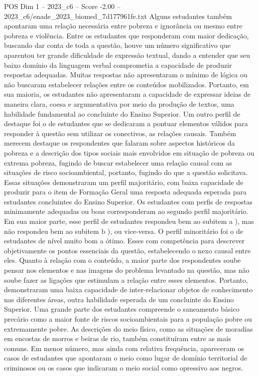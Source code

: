 \begin{textsample}{POS Dim 1 – 2023\_c6 – Score -2.00 – 2023\_c6/enade\_2023\_biomed\_7d177961fe.txt}
Alguns estudantes também apontaram uma relação necessária entre pobreza e ignorância ou mesmo entre pobreza e violência.
Entre os estudantes que responderam com maior dedicação, buscando dar conta de toda a questão, houve um número significativo que aparentou ter grande dificuldade de expressão textual, dando a entender que seu baixo domínio da linguagem verbal comprometia a capacidade de produzir respostas adequadas.
Muitas respostas não apresentaram o mínimo de lógica ou não buscaram estabelecer relações entre os conteúdos mobilizados.
Portanto, em sua maioria, os estudantes não apresentaram a capacidade de expressar ideias de maneira clara, coesa e argumentativa por meio da produção de textos, uma habilidade fundamental ao concluinte do Ensino Superior.
Um outro perfil de destaque foi o de estudantes que se dedicaram a pontuar elementos válidos para responder à questão sem utilizar os conectivos, as relações causais.
Também merecem destaque os respondentes que falaram sobre aspectos históricos da pobreza e a descrição dos tipos sociais mais envolvidos em situação de pobreza ou extrema pobreza, fugindo de buscar estabelecer uma relação causal com as situações de risco socioambiental, portanto, fugindo do que a questão solicitava.
Essas situações demonstraram um perfil majoritário, com baixa capacidade de produzir para o item de Formação Geral uma resposta adequada esperada para estudantes concluintes do Ensino Superior.
Os estudantes com perfis de respostas minimamente adequadas ou boas corresponderam ao segundo perfil majoritário.
Em sua maior parte, esse perfil de estudantes respondeu bem ao subitem a ), mas não respondeu bem ao subitem b ), ou vice-versa.
O perfil minoritário foi o de estudantes de nível muito bom a ótimo.
Esses com competência para descrever objetivamente os pontos essenciais da questão, estabelecendo o nexo causal entre eles.
Quanto à relação com o conteúdo, a maior parte dos respondentes soube pensar nos elementos e nas imagens do problema levantado na questão, mas não soube fazer as ligações que estimulam a relação entre esses elementos.
Portanto, demonstraram uma baixa capacidade de inter-relacionar objetos de conhecimento nas diferentes áreas, outra habilidade esperada de um concluinte do Ensino Superior.
Uma grande parte dos estudantes compreende o saneamento básico precário como a maior fonte de riscos socioambientais para a população pobre ou extremamente pobre.
As descrições do meio físico, como as situações de moradias em encostas de morros e beiras de rio, também constituíram entre as mais comuns.
Em menor número, mas ainda com relativa frequência, apareceram os casos de estudantes que apontaram o meio como lugar de domínio territorial de criminosos ou os casos que indicaram o meio social como opressivo aos negros.

\end{textsample}
